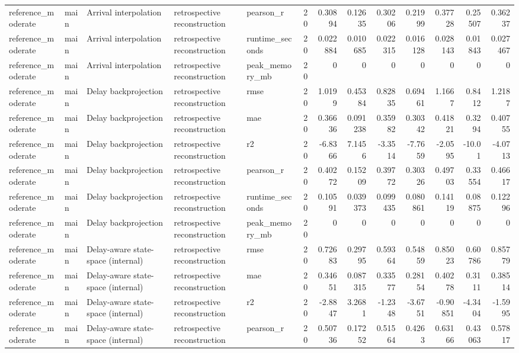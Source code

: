 \begin{table}[!htbp]
{{\begin{tabular}{lllllrrrrrrrr}
reference_moderate & main & Arrival interpolation & retrospective reconstruction & pearson_r & 20 & 0.30894 & 0.12635 & 0.30206 & 0.21999 & 0.37728 & 0.25507 & 0.36237 \\
reference_moderate & main & Arrival interpolation & retrospective reconstruction & runtime_seconds & 20 & 0.022884 & 0.010685 & 0.022315 & 0.016128 & 0.028143 & 0.01843 & 0.027467 \\
reference_moderate & main & Arrival interpolation & retrospective reconstruction & peak_memory_mb & 20 & 0 & 0 & 0 & 0 & 0 & 0 & 0 \\
reference_moderate & main & Delay backprojection & retrospective reconstruction & rmse & 20 & 1.0199 & 0.45384 & 0.82835 & 0.69461 & 1.1667 & 0.8412 & 1.2187 \\
reference_moderate & main & Delay backprojection & retrospective reconstruction & mae & 20 & 0.36636 & 0.091238 & 0.35982 & 0.30342 & 0.41821 & 0.3294 & 0.40755 \\
reference_moderate & main & Delay backprojection & retrospective reconstruction & r2 & 20 & -6.8366 & 7.1456 & -3.3514 & -7.7659 & -2.0595 & -10.01 & -4.0713 \\
reference_moderate & main & Delay backprojection & retrospective reconstruction & pearson_r & 20 & 0.40272 & 0.15209 & 0.39772 & 0.30326 & 0.49703 & 0.33554 & 0.46617 \\
reference_moderate & main & Delay backprojection & retrospective reconstruction & runtime_seconds & 20 & 0.10591 & 0.039373 & 0.099435 & 0.080861 & 0.14119 & 0.08875 & 0.12296 \\
reference_moderate & main & Delay backprojection & retrospective reconstruction & peak_memory_mb & 20 & 0 & 0 & 0 & 0 & 0 & 0 & 0 \\
reference_moderate & main & Delay-aware state-space (internal) & retrospective reconstruction & rmse & 20 & 0.72683 & 0.29795 & 0.59364 & 0.54859 & 0.85023 & 0.60786 & 0.85779 \\
reference_moderate & main & Delay-aware state-space (internal) & retrospective reconstruction & mae & 20 & 0.34651 & 0.087315 & 0.33577 & 0.28154 & 0.40278 & 0.3111 & 0.38514 \\
reference_moderate & main & Delay-aware state-space (internal) & retrospective reconstruction & r2 & 20 & -2.8847 & 3.2681 & -1.2348 & -3.6751 & -0.90851 & -4.3404 & -1.5995 \\
reference_moderate & main & Delay-aware state-space (internal) & retrospective reconstruction & pearson_r & 20 & 0.50736 & 0.17252 & 0.51564 & 0.4263 & 0.63166 & 0.43063 & 0.57817 \\

\end{tabular}}}
\end{table}
